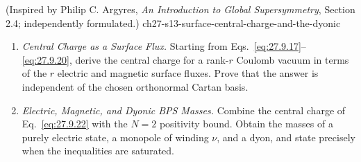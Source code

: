 \begin{enumerate}
    {(Inspired by Philip C. Argyres, \emph{An Introduction to Global Supersymmetry}, Section 2.4; independently formulated.)}
    {ch27-s13-surface-central-charge-and-the-dyonic}
  \begin{enumerate}
    \item \emph{Central Charge as a Surface Flux.}
    Starting from Eqs.~\eqref{eq:27.9.17}--\eqref{eq:27.9.20}, derive the
      central charge for a rank-\(r\) Coulomb vacuum in terms of the \(r\)
      electric and magnetic surface fluxes.  Prove that the answer is
      independent of the chosen orthonormal Cartan basis.
    \item \emph{Electric, Magnetic, and Dyonic BPS Masses.}
    Combine the central charge of Eq.~\eqref{eq:27.9.22} with the \(N=2\)
      positivity bound.  Obtain the masses of a purely electric state, a
      monopole of winding \(\nu\), and a dyon, and state precisely when the
      inequalities are saturated.
  \end{enumerate}

\end{enumerate}
